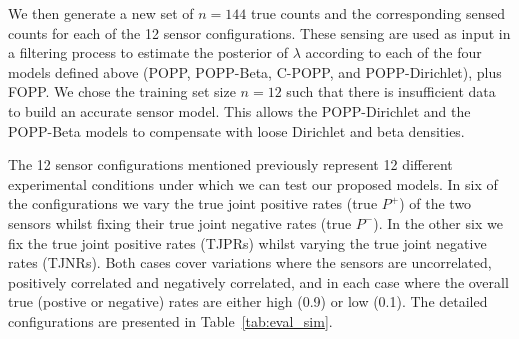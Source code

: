 We then generate a new set of $n=144$ true counts and the corresponding sensed counts for each of the 12 sensor configurations. These sensing are used as input in a filtering process to estimate the posterior of $\lambda$ according to each of the four models defined above (POPP, POPP-Beta, C-POPP, and POPP-Dirichlet), plus FOPP.
% 
We chose the training set size $n=12$ such that there is insufficient data to build an accurate sensor model. This allows the POPP-Dirichlet and the POPP-Beta models to compensate with loose Dirichlet and beta densities. 

The 12 sensor configurations mentioned previously represent 12 different experimental conditions under which we can test our proposed models. In six of the configurations we vary the true joint positive rates (true $P^+$) of the two sensors whilst fixing their true joint negative rates (true $P^-$). In the other six we fix the true joint positive rates (TJPRs) whilst varying the true joint negative rates (TJNRs). Both cases cover variations where the sensors are uncorrelated, positively correlated and negatively correlated, and in each case where the overall true (postive or negative) rates are either high (0.9) or low (0.1). The detailed configurations are presented in Table~\ref{tab:eval_sim}. 

